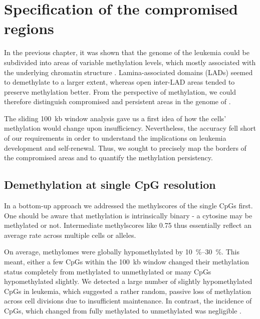 \chapter{Specification of the compromised regions}
\label{chap:r:comprom:introduction} 
\minitoc

In the previous chapter, it was shown that the genome of the \dnmtchip \kitpos leukemia could be subdivided into areas of variable methylation levels, which mostly associated with the underlying chromatin structure . Lamina-associated domains (LADs) seemed to demethylate to a larger extent, whereas open inter-LAD areas tended to preserve methylation better. From the perspective of methylation, we could therefore distinguish compromised and persistent areas in the genome of \dnmtchip.

The sliding \SI{100}{\kilo b} window analysis gave us a first idea of how the cells' methylation would change upon  insufficiency. Nevertheless, the accuracy fell short of our requirements in order to understand the implications on leukemia development and self-renewal. Thus, we sought to precisely map the borders of the compromised areas and to quantify the methylation persistency. 

\section{Demethylation at single CpG resolution}
\label{chap:r:comprom:single_cpg}

In a bottom-up approach we addressed the methylscores of the single CpGs first. One should be aware that methylation is intrinsically binary - a cytosine may be methylated or not. Intermediate methylscores like \num{0.75} thus essentially reflect an average rate across multiple cells or alleles. 

On average, \dnmtchip methylomes were globally hypomethylated by \SIrange{10}{30}{\percent}. This meant, either a few CpGs within the \SI{100}{\kilo b} window changed their methylation status completely from methylated to unmethylated or many CpGs hypomethylated slightly. We detected a large number of slightly hypomethylated CpGs in \dnmtchip \kitpos leukemia, which suggested a rather random, passive loss of methylation across cell divisions due to insufficient maintenance. In contrast, the incidence of CpGs, which changed from fully methylated to unmethylated was negligible . 

